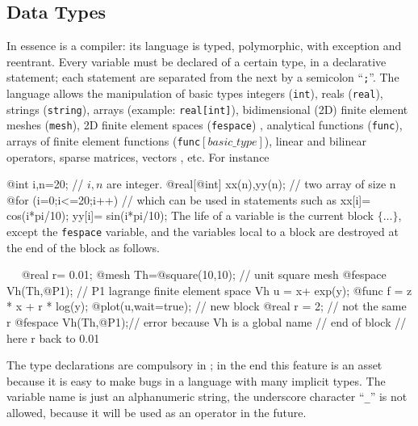 \documentclass[a4paper,twoside,12pt]{book}
\begin{document}
\subsection{Data Types}
In essence \freefempp  is a  compiler:
  its language is typed, polymorphic, with exception and reentrant.
Every variable must be declared of a certain type,  in a  declarative statement;
each statement are separated
from the next by a semicolon ``\texttt{;}''.
The language allows the manipulation of basic types
integers (\texttt{int}), reals (\texttt{real}), strings (\texttt{string}),
arrays (example: \texttt{real[int]}),
 bidimensional (2D) finite element meshes (\texttt{mesh}),
2D finite element spaces (\texttt{fespace}) , analytical functions
(\texttt{func}), arrays of
finite element functions (\texttt{func$[basic\_type]$}),
linear and bilinear operators, sparse matrices, vectors , etc. For instance

\bFF
  @int i,n=20;               //  $ i,n$ are integer.
  @real[@int] xx(n),yy(n);    //  two array of size n
  @for (i=0;i<=20;i++)       // which can be used in statements such as
   { xx[i]= cos(i*pi/10); yy[i]= sin(i*pi/10); }
\eFF
The life of a variable is the current block $\{\ldots \}$, except the \texttt{fespace}
variable, and the variables local to a block are destroyed at the end of the block as follows.
\begin{example}~~
\bFF
@real r= 0.01;
@mesh Th=@square(10,10); // unit square mesh
@fespace Vh(Th,@P1);     // P1 lagrange finite  element space
Vh u = x+ exp(y);
@func f = z * x + r * log(y);
@plot(u,wait=true);
{  // new block
  @real r = 2; // not the same r
  @fespace Vh(Th,@P1);//  error because Vh is a global name
}  // end of block
//  here r back to 0.01
\eFF
\end{example}
The type declarations are  compulsory in \freefempp; in the end this feature is an asset because it is easy
to make bugs in a language with many implicit types.  The
variable name is just an alphanumeric  string, the
underscore character  ``\texttt{\_}'' is not allowed, because
it will be used as an operator in the future.\index{\_}
\end{document}
